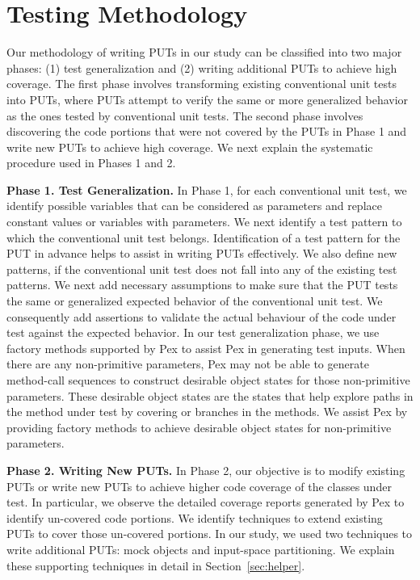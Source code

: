 \section{Testing Methodology}
\label{sec:methods}
Our methodology of writing PUTs in our study can be classified into two major phases: (1) test generalization and (2) writing additional PUTs to achieve high coverage. The first phase involves transforming existing
conventional unit tests into PUTs, where PUTs 
attempt to verify the same or more generalized behavior as the ones tested by conventional unit tests. The second phase involves discovering the code portions that were not covered by the PUTs in Phase 1 and write new PUTs to achieve high coverage. We next explain the systematic procedure used in Phases 1 and 2.

\textbf{Phase 1. Test Generalization.}
In Phase 1, for each conventional unit test, we identify possible variables that can be considered as parameters and replace constant values or variables with
parameters. We next identify a test pattern to which
the conventional unit test belongs. Identification of a test pattern for the PUT in advance helps
to assist in writing PUTs effectively. We also define new patterns,
if the conventional unit test does not fall into any of the existing test patterns. We next 
add necessary assumptions to make sure that the PUT tests the same or generalized expected
behavior of the conventional unit test. We consequently add assertions to validate the actual behaviour of the code under test against the expected behavior. In our test generalization phase, we use factory methods supported by Pex to assist Pex in generating test inputs. When there are any non-primitive parameters, Pex may not be able to generate method-call sequences to construct desirable
object states for those non-primitive parameters. These desirable object states are 
the states that help explore paths in the method under test by covering 
or  branches in the methods. We assist Pex by providing
factory methods to achieve desirable object states for non-primitive parameters. 

\textbf{Phase 2. Writing New PUTs.} In Phase 2, our objective is to modify existing PUTs or write new PUTs to achieve higher code coverage of the classes under test. In particular, we observe the detailed
coverage reports generated by Pex to identify un-covered code portions. We identify
techniques to extend existing PUTs to cover those un-covered portions.
In our study, we used two techniques to write additional PUTs: mock objects and input-space partitioning. We explain these supporting techniques in detail in Section~\ref{sec:helper}. 